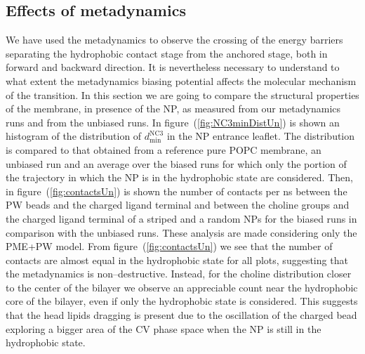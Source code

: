 \subsection{Effects of metadynamics}
We have used the metadynamics to observe the crossing of the energy barriers separating the hydrophobic contact stage from the anchored stage, both in forward and backward direction. It is nevertheless necessary to understand to what extent the metadynamics biasing potential affects the molecular mechanism of the transition. In this section we are going to compare the structural properties of the membrane, in presence of the \ac{NP}, as measured from our metadynamics runs and from the unbiased runs. In figure~(\ref{fig:NC3minDistUn}) is shown an histogram of the distribution of $d_\text{min}^{\text{NC}3}$ in the \ac{NP} entrance leaflet. The distribution is compared to that obtained from a reference pure \ac{POPC} membrane, an unbiased run and an average over the biased runs for which only the portion of the trajectory in which the \ac{NP} is in the hydrophobic state are considered. Then, in figure~(\ref{fig:contactsUn}) is shown the number of contacts per ns between the \ac{PW} beads and the charged ligand terminal and between the choline groups and the charged ligand terminal of a striped and a random \acp{NP} for the biased runs in comparison with the unbiased runs. These analysis are made considering only the \ac{PME}+\ac{PW} model. From figure~(\ref{fig:contactsUn}) we see that the number of contacts are almost equal in the hydrophobic state for all plots, suggesting that the metadynamics is non--destructive. Instead, for the choline distribution closer to the center of the bilayer we observe an appreciable count near the hydrophobic core of the bilayer, even if only the hydrophobic state is considered. This suggests that the head lipids dragging is present due to the oscillation of the charged bead exploring a bigger area of the \ac{CV} phase space when the \ac{NP} is still in the hydrophobic state.
